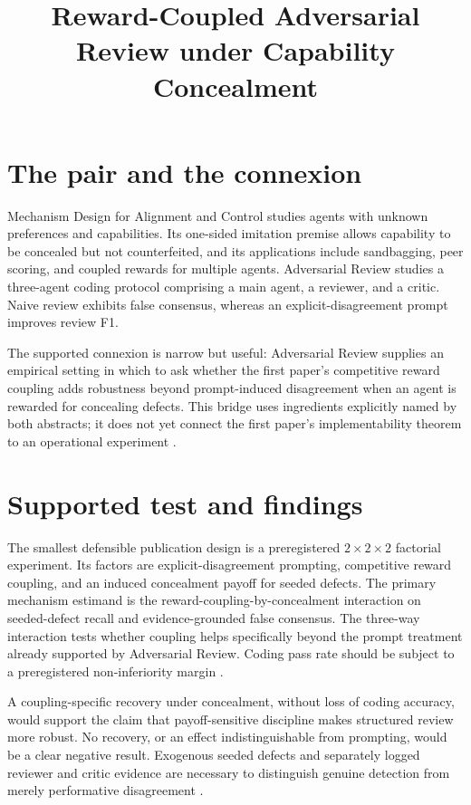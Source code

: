 \documentclass{article}
\title{Reward-Coupled Adversarial Review under Capability Concealment}
\begin{document}
\maketitle

\section{The pair and the connexion}

Mechanism Design for Alignment and Control studies agents with unknown preferences and capabilities.  Its one-sided imitation premise allows capability to be concealed but not counterfeited, and its applications include sandbagging, peer scoring, and coupled rewards for multiple agents.  Adversarial Review studies a three-agent coding protocol comprising a main agent, a reviewer, and a critic.  Naive review exhibits false consensus, whereas an explicit-disagreement prompt improves review F1.

The supported connexion is narrow but useful: Adversarial Review supplies an empirical setting in which to ask whether the first paper's competitive reward coupling adds robustness beyond prompt-induced disagreement when an agent is rewarded for concealing defects.  This bridge uses ingredients explicitly named by both abstracts; it does not yet connect the first paper's implementability theorem to an operational experiment .

\section{Supported test and findings}

The smallest defensible publication design is a preregistered \(2\times2\times2\) factorial experiment.  Its factors are explicit-disagreement prompting, competitive reward coupling, and an induced concealment payoff for seeded defects.  The primary mechanism estimand is the reward-coupling-by-concealment interaction on seeded-defect recall and evidence-grounded false consensus.  The three-way interaction tests whether coupling helps specifically beyond the prompt treatment already supported by Adversarial Review.  Coding pass rate should be subject to a preregistered non-inferiority margin .

A coupling-specific recovery under concealment, without loss of coding accuracy, would support the claim that payoff-sensitive discipline makes structured review more robust.  No recovery, or an effect indistinguishable from prompting, would be a clear negative result.  Exogenous seeded defects and separately logged reviewer and critic evidence are necessary to distinguish genuine detection from merely performative disagreement .
\end{document}
